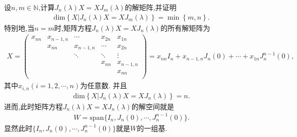 \documentclass[../../main.tex]{subfiles}%
\begin{document}
\begin{corollary}\label{corollary:与Jordan块J_n(lambda)可交换的矩阵}
设$n,m\in\mathbb{N}$,计算$J_n(\lambda)X = XJ_m(\lambda)$的解矩阵,并证明
\begin{align*}
\mathrm{dim}\left\{ X|J_n\left( \lambda \right) X=XJ_m\left( \lambda \right) \right\} =\min \left\{ m,n \right\}.
\end{align*}
特别地,当$n=m$时,矩阵方程$J_n(\lambda)X = XJ_n(\lambda)$的所有解矩阵为
\begin{align*}
X=\left( \begin{matrix}
x_{nn}&		x_{n-1,n}&		\cdots&		x_{2n}&		x_{1n}\\
&		x_{nn}&		x_{n-1,n}&		\cdots&		x_{2n}\\
&		&		\ddots&		\ddots&		\vdots\\
&		&		&		x_{nn}&		x_{n-1,n}\\
&		&		&		&		x_{nn}\\
\end{matrix} \right) =x_{nn}I_n + x_{n-1,n}J_n(0) +\cdots+ x_{1n}J_n^{n-1}(0),
\end{align*}
其中$x_{i,n}(i=1,2,\cdots,n)$为任意数.
并且
\begin{align*}
\mathrm{dim}\left\{ X|J_n\left( \lambda \right) X=XJ_n\left( \lambda \right) \right\} = n.
\end{align*}
进而,此时矩阵方程$J_n(\lambda)X = XJ_n(\lambda)$的解空间就是
\begin{align*}
W = \text{span}\{I_n,J_n(0),\cdots , J_n^{n-1}(0)\}.
\end{align*}
显然此时$\{I_n,J_n(0),\cdots , J_n^{n-1}(0)\}$就是$W$的一组基.
\end{corollary}
\end{document}
